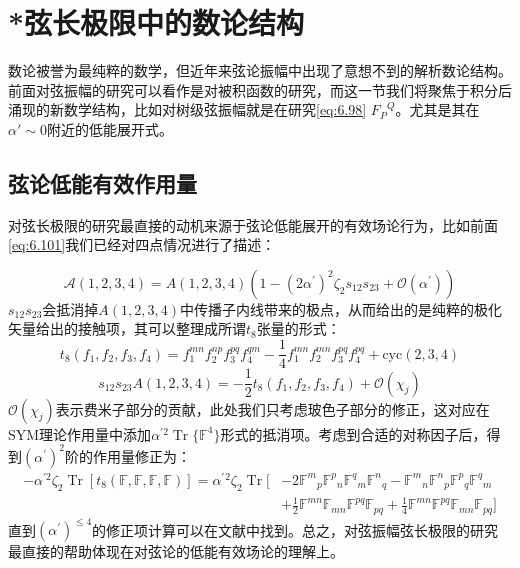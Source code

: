 \section{*弦长极限中的数论结构}
数论被誉为最纯粹的数学，但近年来弦论振幅中出现了意想不到的解析数论结构。前面对弦振幅的研究可以看作是对被积函数的研究，而这一节我们将聚焦于积分后涌现的新数学结构，比如对树级弦振幅就是在研究\ref{eq:6.98} ${F_P}^Q$。尤其是其在$\alpha'\sim 0$附近的低能展开式。
\subsection{弦论低能有效作用量}
对弦长极限的研究最直接的动机来源于弦论低能展开的有效场论行为，比如前面\ref{eq:6.101}我们已经对四点情况进行了描述：

\begin{equation}
	\mathcal{A}(1,2,3,4)=A(1,2,3,4)\left(1-(2\alpha^{\prime})^2\zeta_2s_{12}s_{23}+\mathcal{O}(\alpha^{\prime})\right)
\end{equation}
$s_{12}s_{23}$会抵消掉$A(1,2,3,4)$中传播子内线带来的极点，从而给出的是纯粹的极化矢量给出的接触项，其可以整理成所谓$t_8$张量的形式：
\begin{equation}
	t_8(f_1,f_2,f_3,f_4)=f_1^{mn}f_2^{np}f_3^{pq}f_4^{qm}-\frac{1}{4}f_1^{mn}f_2^{mn}f_3^{pq}f_4^{pq}+\mathrm{cyc}(2,3,4)
\end{equation}
\begin{equation}
	s_{12}s_{23}A(1,2,3,4)=-\frac{1}{2}t_8(f_1,f_2,f_3,f_4)+\mathcal{O}(\chi_j)
\end{equation}
$\mathcal{O}(\chi_j)$表示费米子部分的贡献，此处我们只考虑玻色子部分的修正，这对应在SYM理论作用量中添加$\alpha^{\prime2}\operatorname{Tr}\{\mathbb{F}^4\}$形式的抵消项。考虑到合适的对称因子后，得到$(\alpha^\prime)^2$阶的作用量修正为：
\begin{equation}
\begin{aligned}
		-\alpha^{\prime2}\zeta_2\operatorname{Tr}{\left[t_8(\mathbb{F},\mathbb{F},\mathbb{F},\mathbb{F})\right]}
	=
	\alpha^{\prime}{}^2\zeta_2\operatorname{Tr}\bigg[&-2\mathbb{F}^m{}_p\mathbb{F}^p{}_n\mathbb{F}^q{}_m\mathbb{F}^n{}_q-\mathbb{F}^m{}_n\mathbb{F}^n{}_p\mathbb{F}^p{}_q\mathbb{F}^q{}_m\\
	&+\frac{1}{2}\mathbb{F}^{mn}\mathbb{F}_{mn}\mathbb{F}^{pq}\mathbb{F}_{pq}+\frac{1}{4}\mathbb{F}^{mn}\mathbb{F}^{pq}\mathbb{F}_{mn}\mathbb{F}_{pq}\bigg]
\end{aligned}
\end{equation}
直到$(\alpha^\prime)^{\leq 4}$的修正项计算可以在文献\cite{Barreiro:2012aw}中找到。总之，对弦振幅弦长极限的研究最直接的帮助体现在对弦论的低能有效场论的理解上。

